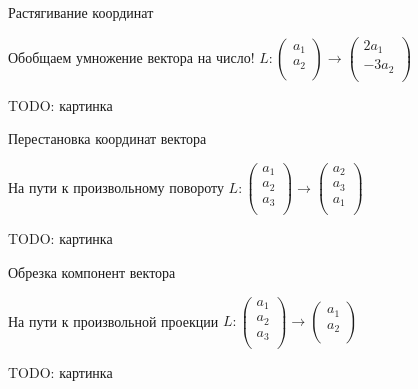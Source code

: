 \documentclass[14pt,xcolor=dvipsnames]{beamer}
\begin{document}
\begin{frame}{Растягивание координат}

\begin{block}{Обобщаем умножение вектора на число!}
  $L : \begin{pmatrix}
    a_1 \\
    a_2 \\
  \end{pmatrix} \to 
  \begin{pmatrix}
    2a_1 \\
    -3a_2 \\
  \end{pmatrix}$
\end{block}

\begin{block}{TODO: картинка}

\end{block}
\end{frame}



\begin{frame}{Перестановка координат вектора}

\begin{block}{На пути к произвольному повороту}
  $L : \begin{pmatrix}
    a_1 \\
    a_2 \\
    a_3 \\
  \end{pmatrix} \to 
  \begin{pmatrix}
    a_2 \\
    a_3 \\
    a_1 \\
  \end{pmatrix}$
\end{block}

\begin{block}{TODO: картинка}

\end{block}
    
\end{frame}




\begin{frame}{Обрезка компонент вектора}

\begin{block}{На пути к произвольной проекции}
  $L : \begin{pmatrix}
    a_1 \\
    a_2 \\
    a_3 \\
  \end{pmatrix} \to 
  \begin{pmatrix}
    a_1 \\
    a_2 \\
  \end{pmatrix}$
\end{block}

\begin{block}{TODO: картинка}

\end{block}
    
\end{frame}
\end{document}
